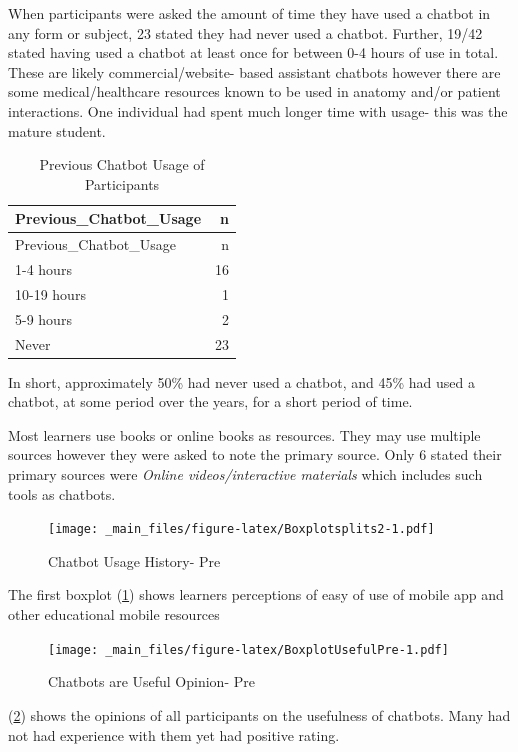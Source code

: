 \documentclass[a4paper, nobind]{templates/ociamthesis}
\begin{document}
When participants were asked the amount of time they have used a chatbot
in any form or subject, 23 stated they had never used a chatbot.
Further, 19/42 stated having used a chatbot at least once for between
0-4 hours of use in total. These are likely commercial/website- based
assistant chatbots however there are some medical/healthcare resources
known to be used in anatomy and/or patient interactions. One individual
had spent much longer time with usage- this was the mature student.

\begin{longtable}[]{@{}lr@{}}
\caption{Previous Chatbot Usage of Participants\\
}\tabularnewline
\toprule()
Previous\_Chatbot\_Usage & n \\
\midrule()
\endfirsthead
\toprule()
Previous\_Chatbot\_Usage & n \\
\midrule()
\endhead
1-4 hours & 16 \\
10-19 hours & 1 \\
5-9 hours & 2 \\
Never & 23 \\
\bottomrule()
\end{longtable}

In short, approximately 50\% had never used a chatbot, and 45\% had used a
chatbot, at some period over the years, for a short period of time.

Most learners use books or online books as resources. They may use multiple sources however they were asked to note the primary source. Only 6 stated their primary sources were \emph{Online videos/interactive materials} which includes such tools as chatbots.

\begin{figure}
\centering
\texttt{[image: \_main\_files/figure-latex/Boxplotsplits2-1.pdf]}
\caption{\label{fig:Boxplotsplits2}Chatbot Usage History- Pre}
\end{figure}

The first boxplot (\ref{fig:Boxplotsplits2}) shows learners perceptions of easy of use of mobile app and other educational mobile resources

\begin{figure}
\centering
\texttt{[image: \_main\_files/figure-latex/BoxplotUsefulPre-1.pdf]}
\caption{\label{fig:BoxplotUsefulPre}Chatbots are Useful Opinion- Pre}
\end{figure}

(\ref{fig:BoxplotUsefulPre}) shows the opinions of all participants on the usefulness of chatbots. Many had not had experience with them yet had positive rating.
\end{document}
